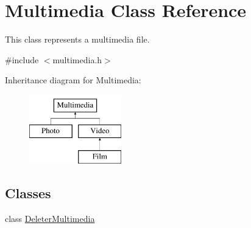 \hypertarget{class_multimedia}{\section{Multimedia Class Reference}
\label{class_multimedia}
}


This class represents a multimedia file.  




{\ttfamily \#include $<$multimedia.\-h$>$}

Inheritance diagram for Multimedia\-:\begin{figure}[H]
\begin{center}
\leavevmode
\includegraphics[height=3.000000cm]{class_multimedia}
\end{center}
\end{figure}
\subsection*{Classes}
\begin{DoxyCompactItemize}
\item 
class \hyperlink{class_multimedia_1_1_deleter_multimedia}{Deleter\-Multimedia}
\end{DoxyCompactItemize}
